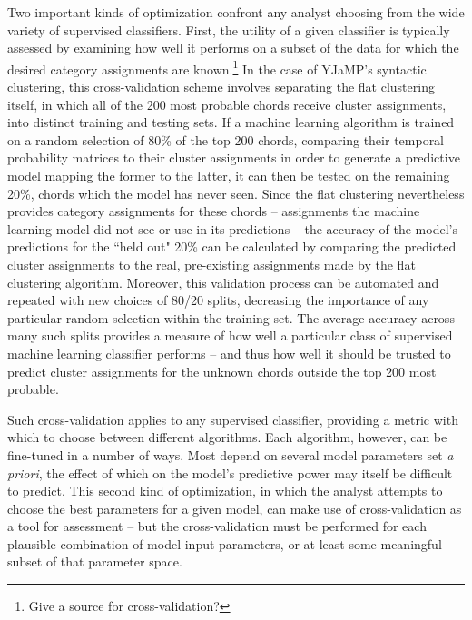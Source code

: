 Two important kinds of optimization confront any analyst choosing from the wide variety of supervised classifiers.  First, the utility of a given classifier is typically assessed by examining how well it performs on a subset of the data for which the desired category assignments are known.\footnote{Give a source for cross-validation?}  In the case of YJaMP's syntactic clustering, this cross-validation scheme involves separating the flat clustering itself, in which all of the 200 most probable chords receive cluster assignments, into distinct training and testing sets.  If a machine learning algorithm is trained on a random selection of 80\% of the top 200 chords, comparing their temporal probability matrices to their cluster assignments in order to generate a predictive model mapping the former to the latter, it can then be tested on the remaining 20\%, chords which the model has never seen.  Since the flat clustering nevertheless provides category assignments for these chords -- assignments the machine learning model did not see or use in its predictions -- the accuracy of the model's predictions for the ``held out" 20\% can be calculated by comparing the predicted cluster assignments to the real, pre-existing assignments made by the flat clustering algorithm.  Moreover, this validation process can be automated and repeated with new choices of 80/20 splits, decreasing the importance of any particular random selection within the training set.  The average accuracy across many such splits provides a measure of how well a particular class of supervised machine learning classifier performs -- and thus how well it should be trusted to predict cluster assignments for the unknown chords outside the top 200 most probable.


Such cross-validation applies to any supervised classifier, providing a metric with which to choose between different algorithms.  Each algorithm, however, can be fine-tuned in a number of ways.  Most depend on several model parameters set \emph{a priori}, the effect of which on the model's predictive power may itself be difficult to predict.  This second kind of optimization, in which the analyst attempts to choose the best parameters for a given model, can make use of cross-validation as a tool for assessment -- but the cross-validation must be performed for each plausible combination of model input parameters, or at least some meaningful subset of that parameter space.

